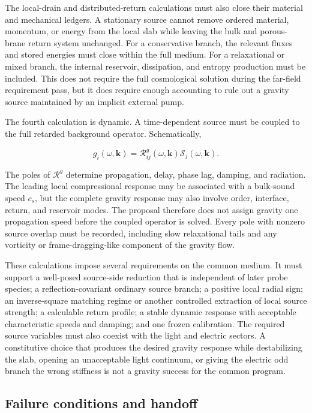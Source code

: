 The local-drain and distributed-return calculations must also close their
material and mechanical ledgers. A stationary source cannot remove ordered
material, momentum, or energy from the local slab while leaving the bulk and
porous-brane return system unchanged.
For a conservative branch, the relevant fluxes and stored energies must close
within the full medium. For a relaxational or mixed branch, the internal
reservoir, dissipation, and entropy production must be included. This does not
require the full cosmological solution during the far-field requirement pass,
but it does require enough accounting to rule out a gravity source maintained
by an implicit external pump.

The fourth calculation is dynamic. A time-dependent source must be coupled to
the full retarded background operator. Schematically,

\[
g_i(\omega,\mathbf k)
=
\mathcal R^g_{ij}(\omega,\mathbf k)
\mathcal S_j(\omega,\mathbf k).
\]

The poles of \(\mathcal R^g\) determine propagation, delay, phase lag, damping,
and radiation. The leading local compressional response may be associated with
a bulk-sound speed \(c_s\), but the complete gravity response may also involve
order, interface, return, and reservoir modes. The proposal therefore does not
assign gravity one propagation speed before the coupled operator is solved.
Every pole with nonzero source overlap must be recorded, including slow
relaxational tails and any vorticity or frame-dragging-like component of the
gravity flow.

These calculations impose several requirements on the common medium. It must
support a well-posed source-side reduction that is independent of later probe
species; a reflection-covariant ordinary source branch; a positive local radial
sign; an inverse-square matching regime or another controlled extraction of
local source strength; a calculable return profile; a stable dynamic response
with acceptable characteristic speeds and damping; and one frozen calibration.
The required source variables must also coexist with the light and electric
sectors. A constitutive choice that produces the desired gravity response while
destabilizing the slab, opening an unacceptable light continuum, or giving the
electric odd branch the wrong stiffness is not a gravity success for the common
program.

\subsection{Failure conditions and handoff}


